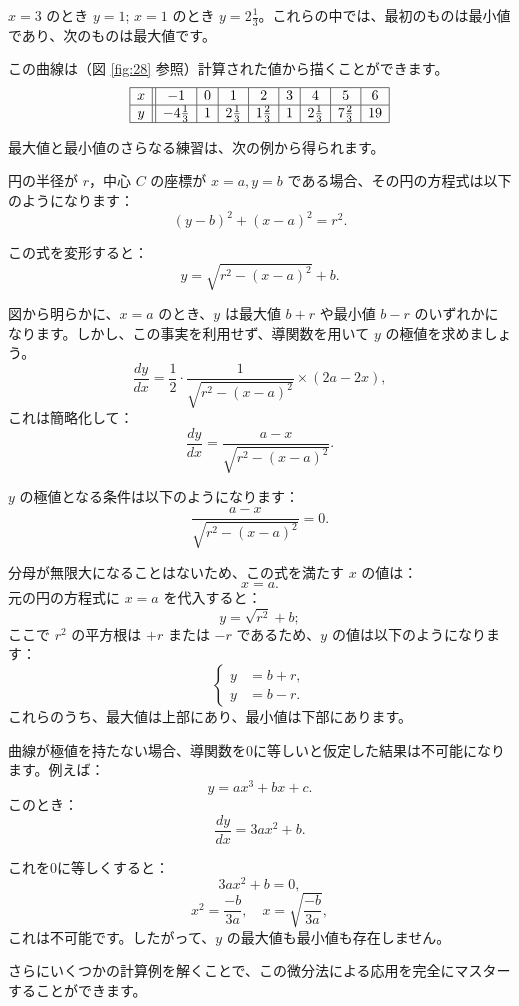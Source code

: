 \documentclass[a4paper,11pt,openany]{ltjsbook}
\begin{document}
$x = 3$ のとき $y = 1$; $x = 1$ のとき $y = 2 \tfrac{1}{3}$。これらの中では、最初のものは最小値であり、次のものは最大値です。

この曲線は（図 \ref{fig:28} 参照）計算された値から描くことができます。
\[
\begin{array}{|c||*{8}{c|}}
\hline
x & -1 & 0 & 1 & 2 & 3 & 4 & 5 & 6 \\
\hline
y & -4\tfrac{1}{3} & 1 &  2\tfrac{1}{3} &  1\tfrac{2}{3} & 1 & 2\tfrac{1}{3} & 7\tfrac{2}{3} & 19 \\
\hline
\end{array}
\]

最大値と最小値のさらなる練習は、次の例から得られます。

円の半径が \( r \)，中心 \( C \) の座標が \( x = a, y = b \) である場合、その円の方程式は以下のようになります：
\[
(y - b)^2 + (x - a)^2 = r^2.
\]

この式を変形すると：
\[
y = \sqrt{r^2 - (x - a)^2} + b.
\]

図から明らかに、\( x = a \) のとき、\( y \) は最大値 \( b + r \) や最小値 \( b - r \) のいずれかになります。しかし、この事実を利用せず、導関数を用いて \( y \) の極値を求めましょう。
\[
\frac{dy}{dx} = \frac{1}{2} \cdot \frac{1}{\sqrt{r^2 - (x - a)^2}} \times (2a - 2x),
\]
これは簡略化して：
\[
\frac{dy}{dx} = \frac{a - x}{\sqrt{r^2 - (x - a)^2}}.
\]

\( y \) の極値となる条件は以下のようになります：
\[
\frac{a - x}{\sqrt{r^2 - (x - a)^2}} = 0.
\]

分母が無限大になることはないため、この式を満たす \( x \) の値は：
\[
x = a.
\]
元の円の方程式に \( x = a \) を代入すると：
\[
y = \sqrt{r^2} + b;
\]
ここで \( r^2 \) の平方根は \( +r \) または \( -r \) であるため、\( y \) の値は以下のようになります：
\[
\left\{
\begin{aligned}
y &= b + r, \\
y &= b - r.
\end{aligned}
\right.
\]
これらのうち、最大値は上部にあり、最小値は下部にあります。

曲線が極値を持たない場合、導関数を0に等しいと仮定した結果は不可能になります。例えば：
\[
y = ax^3 + bx + c.
\]
このとき：
\[
\frac{dy}{dx} = 3ax^2 + b.
\]

これを0に等しくすると：
\[
3ax^2 + b = 0,
\]
\[
x^2 = \frac{-b}{3a}, \quad x = \sqrt{\frac{-b}{3a}},
\]
これは不可能です。したがって、\( y \) の最大値も最小値も存在しません。

さらにいくつかの計算例を解くことで、この微分法による応用を完全にマスターすることができます。
\end{document}
